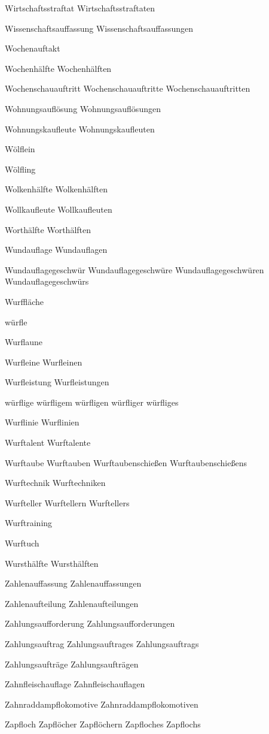 Wirtschaftsstraftat
Wirtschaftsstraftaten

Wissenschaftsauffassung
Wissenschaftsauffassungen

Wochenauftakt

Wochenhälfte
Wochenhälften

Wochenschauauftritt
Wochenschauauftritte
Wochenschauauftritten

Wohnungsauflösung
Wohnungsauflösungen

Wohnungskaufleute
Wohnungskaufleuten

Wölflein

Wölfling

Wolkenhälfte
Wolkenhälften

Wollkaufleute
Wollkaufleuten

Worthälfte
Worthälften

Wundauflage
Wundauflagen

Wundauflagegeschwür
Wundauflagegeschwüre
Wundauflagegeschwüren
Wundauflagegeschwürs

Wurffläche

würfle

Wurflaune

Wurfleine
Wurfleinen

Wurfleistung
Wurfleistungen

würflige
würfligem
würfligen
würfliger
würfliges

Wurflinie
Wurflinien

Wurftalent
Wurftalente

Wurftaube
Wurftauben
Wurftaubenschießen
Wurftaubenschießens

Wurftechnik
Wurftechniken

Wurfteller
Wurftellern
Wurftellers

Wurftraining

Wurftuch

Wursthälfte
Wursthälften

Zahlenauffassung
Zahlenauffassungen

Zahlenaufteilung
Zahlenaufteilungen

Zahlungsaufforderung
Zahlungsaufforderungen

Zahlungsauftrag
Zahlungsauftrages
Zahlungsauftrags

Zahlungsaufträge
Zahlungsaufträgen

Zahnfleischauflage
Zahnfleischauflagen

Zahnraddampflokomotive
Zahnraddampflokomotiven

Zapfloch
Zapflöcher
Zapflöchern
Zapfloches
Zapflochs

